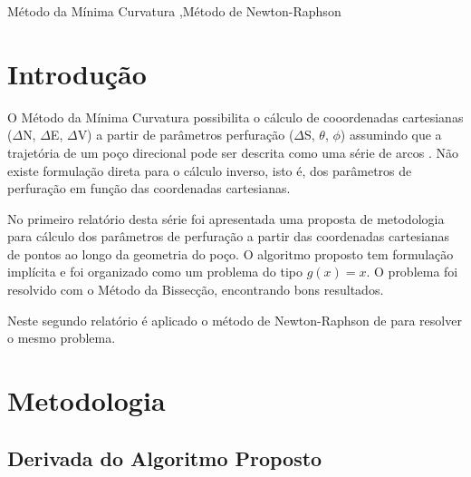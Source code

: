 \documentclass[final,3p,12pt]{elsarticle}
\begin{document}
\begin{frontmatter}

\begin{keyword}
    Método da Mínima Curvatura \sep Método de Newton-Raphson



\end{keyword}

\end{frontmatter}


\section{Introdução}

O Método da Mínima Curvatura possibilita o cálculo de cooordenadas cartesianas ($\Delta$N, $\Delta$E, $\Delta$V) a partir de parâmetros perfuração ($\Delta$S, $\theta$, $\phi$) assumindo que a trajetória de um poço direcional pode ser descrita como uma série de arcos \cite{10.2118/84246-MS}. Não existe formulação direta para o cálculo inverso, isto é, dos parâmetros de perfuração em função das coordenadas cartesianas.

No primeiro relatório desta série \cite{relatoriobisseccao} foi apresentada uma proposta de metodologia para cálculo dos parâmetros de perfuração a partir das coordenadas cartesianas de pontos ao longo da geometria do poço. O algoritmo proposto tem formulação implícita e foi organizado como um problema do tipo $g(x)=x$. O problema foi resolvido com o Método da Bissecção, encontrando bons resultados.

Neste segundo relatório é aplicado o método de Newton-Raphson de para resolver o mesmo problema.

\section{Metodologia}

\subsection{Derivada do Algoritmo Proposto}
\end{document}
